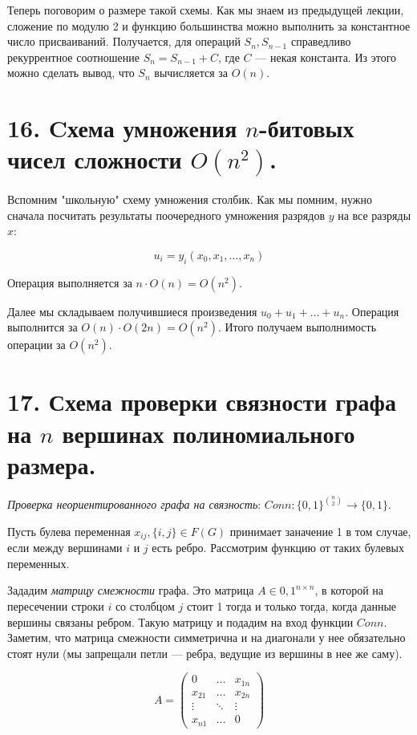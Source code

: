 \documentclass[a4paper, 12pt]{article}
\begin{document}
Теперь поговорим о размере такой схемы. Как мы знаем из предыдущей лекции, сложение по модулю 2 и функцию большинства можно выполнить за константное число присваиваний. Получается, для операций $S_n, S_{n-1}$ справедливо рекуррентное соотношение $S_n = S_{n-1} + C$, где $C$ --- некая константа. Из этого можно сделать вывод, что $S_n$ вычисляется за $O(n)$.

\section*{16. Cхема умножения $n$-битовых чисел сложности $O(n^2)$.}

Вспомним "школьную" схему умножения столбик. Как мы помним, нужно сначала посчитать результаты поочередного умножения разрядов $y$ на все разряды $x$: 

\[u_i = y_i(x_0, x_1, \ldots, x_n)\]

Операция выполняется за $n \cdot O(n) = O(n^2)$.

Далее мы складываем получившиеся произведения $u_0 + u_1 + \ldots + u_n$. Операция выполнится за $O(n) \cdot O(2n) = O(n^2)$. Итого получаем выполнимость операции за $O(n^2)$.

\section*{17. Схема проверки связности графа на $n$ вершинах полиномиального размера.}

\textit{Проверка неориентированного графа на связность}: $Conn: \{0,1\}^{n \choose 2} \rightarrow \{0,1\}$.

Пусть булева переменная $x_{ij}, \{i,j\} \in F(G)$ принимает заначение 1 в том случае, если между вершинами $i$ и $j$ есть ребро. Рассмотрим функцию от таких булевых переменных.

Зададим \textit{матрицу смежности} графа. Это матрица $A \in {0, 1}^{n \times n}$, в которой на пересечении строки $i$ со столбцом $j$ стоит 1 тогда и только тогда, когда данные вершины связаны ребром. Такую матрицу и подадим на вход функции $Conn$. Заметим, что матрица смежности симметрична и на диагонали у нее обязательно стоят нули (мы запрещали петли --- ребра, ведущие из вершины в нее же саму).

\[A = \begin{pmatrix} 0 & \ldots & x_{1n} \\ x_{21} & \ldots & x_{2n} \\ \vdots & \ddots & \vdots \\ x_{n1} & \ldots & 0 \end{pmatrix}\]  
\end{document}
